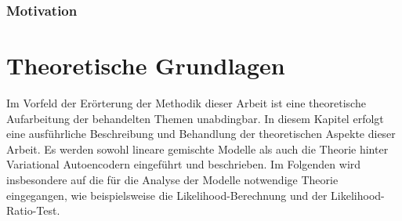 \documentclass[%
thesis=student,%
coverpage=false,%
titlepage=false,%
headmarks=true, %
german,%
font=libertine, %
math=newpxtx, %
BCOR=5mm,%
coverBCOR=11mm%
]{tumbook}
\theoremstyle{break}
\begin{document}
\subsection{Motivation}


\chapter{Theoretische Grundlagen}
Im Vorfeld der Erörterung der Methodik dieser Arbeit ist eine theoretische Aufarbeitung der behandelten Themen unabdingbar. In diesem Kapitel erfolgt eine ausführliche Beschreibung und Behandlung der theoretischen Aspekte dieser Arbeit. Es werden sowohl lineare gemischte Modelle als auch die Theorie hinter Variational Autoencodern eingeführt und beschrieben. Im Folgenden wird insbesondere auf die für die Analyse der Modelle notwendige Theorie eingegangen, wie beispielsweise die Likelihood-Berechnung und der Likelihood-Ratio-Test.
\end{document}
